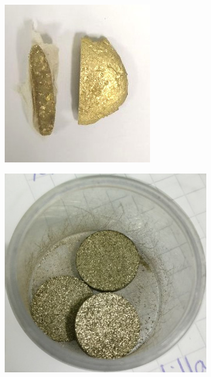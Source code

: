 \documentclass[a4paper,12pt,fleqn,twoside,openany]{book}
\begin{document}
\begin{figure}[h]
\begin{subfigure}{0.1\textwidth}
        \caption{}
        \label{fig:ampolla}
    \end{subfigure}
    \begin{subfigure}{0.2\textwidth}
        \includegraphics[width=\textwidth]{Img/Procedimiento/boton.jpg}
        \caption{}
        \label{fig:boton}
    \end{subfigure}
    \begin{subfigure}{0.2\textwidth}
        \includegraphics[width=\textwidth]{Img/Procedimiento/PastViruta.jpg}

\end{subfigure}
\end{figure}
\end{document}
